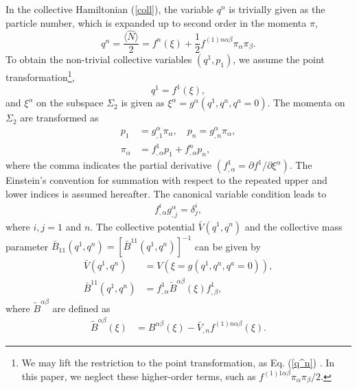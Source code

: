 \documentclass[%
superscriptaddress,
showpacs,
nofootinbib,
amsmath,amssymb,
aps,
prc,
twocolumn,
floatfix ]%
{revtex4-1}
\begin{document}
In the collective Hamiltonian (\ref{coll}), the variable $q^n$ is
trivially given as the particle number, which is expanded up to
second order in the momenta $\pi$,
\begin{equation}
q^n=\frac{\langle \hat{N} \rangle}{2} = f^n(\xi)
	+\frac{1}{2}f^{(1)n\alpha\beta}\pi_\alpha\pi_\beta .
	\label{q^n}
\end{equation}
To obtain the non-trivial collective variables
$(q^1,p_1)$, we assume the point transformation\footnote{
We may lift the restriction to the point transformation,
as Eq. (\ref{q^n}) \cite{Sat18}.
In this paper, we neglect these higher-order terms, such as
$f^{(1)1\alpha\beta}\pi_\alpha\pi_\beta/2$.
},
\begin{equation}
  q^1 = f^1(\xi) \label{point} ,
\end{equation}
and $\xi^\alpha$ on the subspace $\Sigma_2$ is given as
$\xi^{\alpha} = g^{\alpha}(q^1,q^n,q^a=0)$.
The momenta on $\Sigma_2$ are transformed as
\begin{align}
p_1 &= g_{,1}^{\alpha}\pi_{\alpha} , \quad p_n = g_{,n}^\alpha \pi_\alpha,
	\label{coll_momenta}\\
\pi_{\alpha} &= f^1_{,\alpha}p_1 +f^n_{,\alpha}p_n,
 \label{momenta}
\end{align}
where the comma indicates the partial derivative
$(f^1_{,\alpha}=\partial f^1/\partial \xi^{\alpha})$. 
The Einstein's convention for summation with respect to the repeated
upper and lower indices is assumed hereafter.
The canonical variable condition leads to
\begin{align}
f^i_{,\alpha}g_{,j}^{\alpha} = \delta^i_j,
  \label{canonicity}
\end{align}
where $i,j=1$ and $n$.
The collective potential $\bar{V}(q^1,q^n)$ and
the collective mass parameter
$\bar{B}_{11}(q^1,q^n)=[\bar{B}^{11}(q^1,q^n)]^{-1}$ can be given by
\begin{align}
\bar{V}(q^1,q^n) &= V(\xi=g(q^1,q^n,q^a=0)), \\
\bar{B}^{11}(q^1,q^n) &= f^1_{,\alpha}\tilde{B}^{\alpha\beta}(\xi)f^1_{,\beta} ,
  \label{coll_mass}
\end{align}
where $\tilde{B}^{\alpha\beta}$ are defined as
\begin{align}
 \tilde{B}^{\alpha\beta}(\xi)
&= B^{\alpha\beta}(\xi) - \bar{V}_{,n} f^{(1)n\alpha\beta}(\xi)
\label{tildeB}.
\end{align} 
\end{document}
